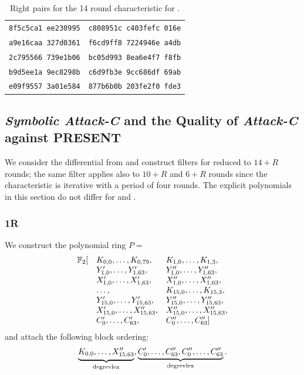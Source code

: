 \begin{table}
\begin{center}
\begin{tabular}{|c|c|}
\texttt{8f5c5ca1 ee230995} & \texttt{c808951c c403fefc 016e}\\
\texttt{a9e16caa 327d0361} & \texttt{f6cd9ff8 7224946e a4db}\\
\texttt{2c795566 739e1b06} & \texttt{bc05d993 8ea6e4f7 f8fb}\\
\texttt{b9d5ee1a 9ec8298b} & \texttt{c6d9fb3e 9cc686df 69ab}\\
\texttt{e09f9557 3a01e584} & \texttt{877b6b0b 203fe2f0 fde3}\\
\hline
\end{tabular}
\end{center}
\caption{Right pairs for the 14 round characteristic \cite{present-dc:africacrypt} for .}
\label{tab:present80-right-pairs}
\end{table}


\subsection{\emph{Symbolic Attack-C} and the Quality of \emph{Attack-C} against PRESENT}
\label{sec:present-symbolic-attack-c}
We consider the differential from \cite{present-dc:africacrypt} and construct filters for \PRESENT reduced to $14 + R$ rounds; the same filter applies also to $10 + R$ and $6 + R$ rounds since the characteristic is iterative with a period of four rounds. The explicit polynomials in this section do not differ for  and .

\subsubsection*{1R}
We construct the polynomial ring $P = $
\begin{displaymath}
\begin{array}{lll}\mathbb{F}_2[&K_{0,0},\dots, K_{0,79}, &
K_{1,0},\dots,K_{1,3},\\
&Y'_{1,0}, \dots,Y'_{1,63},  & Y''_{1,0}, \dots,Y''_{1,63}, \\
&X'_{1,0}, \dots,X'_{1,63}, & X''_{1,0}, \dots,X''_{1,63},\\
&\dots,& K_{15,0},\dots,K_{15,3},\\
& Y'_{15,0}, \dots,Y'_{15,63}, & Y''_{15,0}, \dots,Y''_{15,63},\\
& X'_{15,0}, \dots,X''_{15,63}, & X''_{15,0}, \dots,X''_{15,63},\\
& C'_{0}, \dots,C'_{63}, & C''_{0}, \dots,C''_{63}]\end{array}
\end{displaymath}
and attach the following block ordering:
\begin{displaymath}
\underbrace{K_{0,0}, \dots,X''_{15,63}}_\textnormal{degrevlex},
\underbrace{C'_{0}, \dots,C''_{63}, C''_{0},
\dots,C''_{63}}_\textnormal{degrevlex}.
\end{displaymath}

